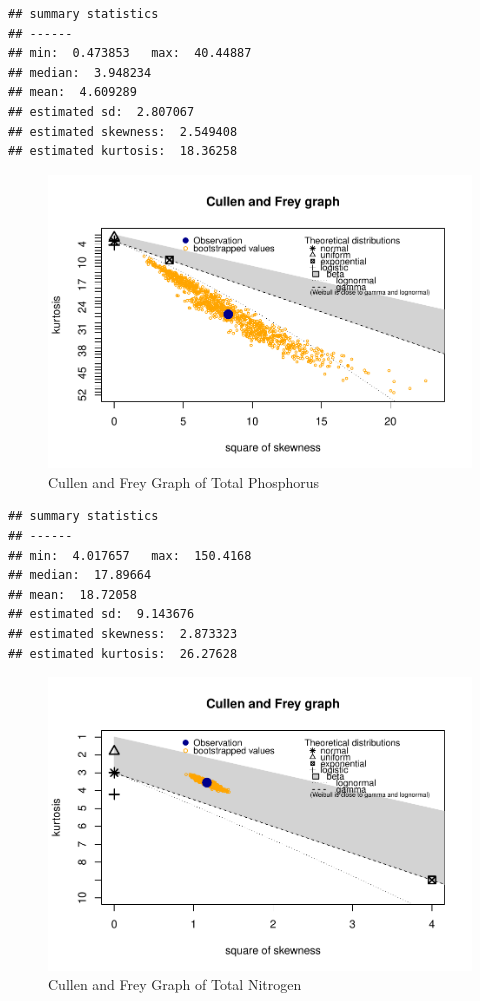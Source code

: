 \documentclass[
]{article}
\begin{document}
\begin{verbatim}
## summary statistics
## ------
## min:  0.473853   max:  40.44887 
## median:  3.948234 
## mean:  4.609289 
## estimated sd:  2.807067 
## estimated skewness:  2.549408 
## estimated kurtosis:  18.36258
\end{verbatim}

\begin{figure}
\centering
\includegraphics{Final-Report_files/figure-latex/cfTP-1.pdf}
\caption{\label{fig:cfTP}Cullen and Frey Graph of Total Phosphorus}
\end{figure}

\begin{verbatim}
## summary statistics
## ------
## min:  4.017657   max:  150.4168 
## median:  17.89664 
## mean:  18.72058 
## estimated sd:  9.143676 
## estimated skewness:  2.873323 
## estimated kurtosis:  26.27628
\end{verbatim}

\begin{figure}
\centering
\includegraphics{Final-Report_files/figure-latex/cfTN-1.pdf}
\caption{\label{fig:cfTN}Cullen and Frey Graph of Total Nitrogen}
\end{figure}
\end{document}
